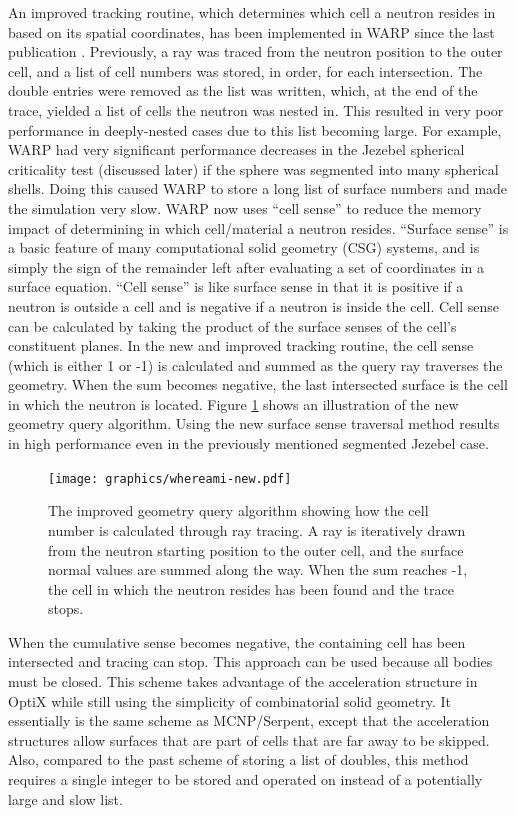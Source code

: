 \documentclass[preprint,12pt]{elsarticle}
\begin{document}
An improved tracking routine, which determines which cell a neutron resides in based on its spatial coordinates, has been implemented in WARP since the last publication \cite{algorithms}.  Previously, a ray was traced from the neutron position to the outer cell, and a list of cell numbers was stored, in order, for each intersection.  The double entries were removed as the list was written, which, at the end of the trace, yielded a list of cells the neutron was nested in.  This resulted in very poor performance in deeply-nested cases due to this list becoming large.  For example, WARP had very significant performance decreases in the Jezebel spherical criticality test (discussed later) if the sphere was segmented into many spherical shells.  Doing this caused WARP to store a long list of surface numbers and made the simulation very slow.  
WARP now uses ``cell sense'' to reduce the memory impact of determining in which cell/material a neutron resides.  ``Surface sense'' is a basic feature of many computational solid geometry (CSG) systems, and is simply the sign of the remainder left after evaluating a set of coordinates in a surface equation. ``Cell sense'' is like surface sense in that it is positive if a neutron is outside a cell and is negative if a neutron is inside the cell.  Cell sense can be calculated by taking the product of the surface senses of the cell's constituent planes.  In the new and improved tracking routine, the cell sense (which is either 1 or -1) is calculated and summed as the query ray traverses the geometry.  When the sum becomes negative, the last intersected surface is the cell in which the neutron is located.   Figure \ref{whereami} shows an illustration of the new geometry query algorithm.  Using the new surface sense traversal method results in high performance even in the previously mentioned segmented Jezebel case.

\begin{figure}[h!]
\centering
\texttt{[image: graphics/whereami-new.pdf]}
\caption{The improved geometry query algorithm showing how the cell number is calculated through ray tracing.  A ray is iteratively drawn from the neutron starting position to the outer cell, and the surface normal values are summed along the way.  When the sum reaches -1, the cell in which the neutron resides has been found and the trace stops. \label{whereami} }
\end{figure}

 When the cumulative sense becomes negative, the containing cell has been intersected and tracing can stop.  This approach can be used because all bodies must be closed.  This scheme takes advantage of the acceleration structure in OptiX while still using the simplicity of combinatorial solid geometry.  It essentially is the same scheme as MCNP/Serpent, except that the acceleration structures allow surfaces that are part of cells that are far away to be skipped.  Also, compared to the past scheme of storing a list of doubles, this method requires a single integer to be stored and operated on instead of a potentially large and slow list. 
\end{document}
